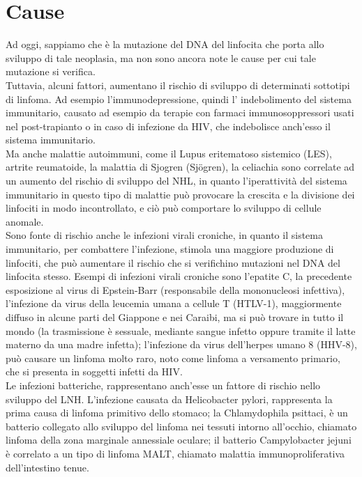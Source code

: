 \section{Cause}
Ad oggi, sappiamo che è la mutazione del DNA del linfocita che porta allo sviluppo di tale neoplasia, 
ma non sono ancora note le cause per cui tale mutazione si verifica.\\ 
Tuttavia, alcuni fattori, aumentano il rischio di sviluppo di determinati sottotipi di linfoma. Ad esempio 
l’immunodepressione, quindi l’ indebolimento del sistema immunitario, causato ad esempio da terapie con farmaci 
immunosoppressori usati nel post-trapianto o in caso di infezione da HIV, che indebolisce anch’esso 
il sistema immunitario.\\ 
Ma anche malattie autoimmuni, come il Lupus eritematoso sistemico (LES), artrite reumatoide, 
la malattia di Sjogren (Sjögren), la celiachia sono correlate ad un aumento del rischio di sviluppo del NHL, 
in quanto l’iperattività del sistema immunitario in questo tipo di malattie può provocare la crescita e la 
divisione dei linfociti in modo incontrollato, 
e ciò può comportare lo sviluppo di cellule anomale\cite{AMERICANCS}.\\
Sono fonte di rischio anche le infezioni virali croniche, in quanto il sistema immunitario, 
per combattere l’infezione, stimola una maggiore produzione di linfociti, che può aumentare il rischio che si 
verifichino mutazioni nel DNA del linfocita stesso. Esempi di infezioni virali croniche sono l’epatite C, 
la precedente esposizione al virus di Epstein-Barr (responsabile della mononucleosi infettiva), 
l'infezione da virus della leucemia umana a cellule T (HTLV-1), maggiormente diffuso in alcune parti del 
Giappone e nei Caraibi, ma si può trovare in tutto il mondo (la trasmissione è sessuale, mediante sangue infetto 
oppure tramite il latte materno da una madre infetta); l’infezione da virus dell'herpes umano 8 (HHV-8), 
può causare un linfoma molto raro, noto come linfoma a versamento primario, che si presenta in soggetti infetti da HIV.\\
Le infezioni batteriche, rappresentano anch’esse un fattore di rischio nello sviluppo del LNH. 
L’infezione causata da Helicobacter pylori, rappresenta la prima causa di linfoma primitivo dello stomaco; 
la Chlamydophila psittaci, è un batterio collegato allo sviluppo del linfoma nei tessuti intorno all’occhio, 
chiamato linfoma della zona marginale annessiale oculare; il batterio Campylobacter jejuni è correlato a un tipo 
di linfoma MALT, chiamato malattia immunoproliferativa dell'intestino tenue\cite{AMERICANCS}.\\
